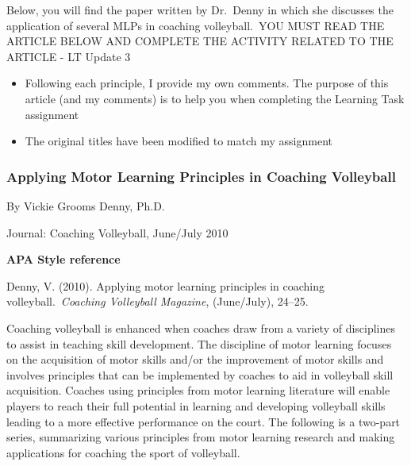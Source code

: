 \documentclass[
  letterpaper,
  DIV=11,
  numbers=noendperiod]{scrartcl}
\begin{document}
\begin{tcolorbox}[enhanced jigsaw, left=2mm, rightrule=.15mm, opacityback=0, colframe=quarto-callout-color-frame, arc=.35mm, leftrule=.75mm, breakable, toprule=.15mm, bottomrule=.15mm, colback=white]

Below, you will find the paper written by Dr.~Denny in which she
discusses the application of several MLPs in coaching volleyball.~YOU
MUST READ THE ARTICLE BELOW AND COMPLETE THE ACTIVITY RELATED TO THE
ARTICLE - LT Update 3

\begin{itemize}
\item
  Following each principle, I provide my own comments. The purpose of
  this article (and my comments) is to help you when completing the
  Learning Task assignment
\item
  The original titles have been modified to match my assignment
\end{itemize}

\end{tcolorbox}

\hypertarget{applying-motor-learning-principles-in-coaching-volleyball}{%
\subsubsection{\texorpdfstring{\textbf{Applying Motor Learning
Principles in Coaching
Volleyball}}{Applying Motor Learning Principles in Coaching Volleyball}}\label{applying-motor-learning-principles-in-coaching-volleyball}}

By Vickie Grooms Denny, Ph.D.

Journal: Coaching Volleyball, June/July 2010

\textbf{APA Style reference}

Denny, V. (2010). Applying motor learning principles in coaching
volleyball.~\emph{Coaching Volleyball Magazine}, (June/July), 24--25.

Coaching volleyball is enhanced when coaches draw from a variety of
disciplines to assist in teaching skill development. The discipline of
motor learning focuses on the acquisition of motor skills and/or the
improvement of motor skills and involves principles that can be
implemented by coaches to aid in volleyball skill acquisition. Coaches
using principles from motor learning literature will enable players to
reach their full potential in learning and developing volleyball skills
leading to a more effective performance on the court. The following is a
two-part series, summarizing various principles from motor learning
research and making applications for coaching the sport of volleyball.
\end{document}
